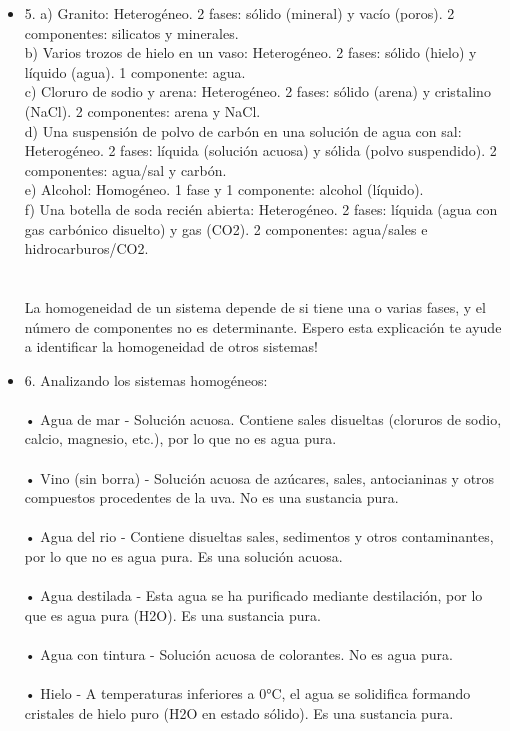 \documentclass{article}
\begin{document}
\begin{itemize}
\item{5.}
a) Granito: Heterogéneo. 2 fases: sólido (mineral) y vacío (poros). 2 componentes: silicatos y minerales.\\
b) Varios trozos de hielo en un vaso: Heterogéneo. 2 fases: sólido (hielo) y líquido (agua). 1 componente: agua.\\
c) Cloruro de sodio y arena: Heterogéneo. 2 fases: sólido (arena) y cristalino (NaCl). 2 componentes: arena y NaCl.\\
d) Una suspensión de polvo de carbón en una solución de agua con sal: Heterogéneo. 2 fases: líquida (solución acuosa) y sólida (polvo suspendido). 2 componentes: agua/sal y carbón.\\
e) Alcohol: Homogéneo. 1 fase y 1 componente: alcohol (líquido).\\
f) Una botella de soda recién abierta: Heterogéneo. 2 fases: líquida (agua con gas carbónico disuelto) y gas (CO2). 2 componentes: agua/sales e hidrocarburos/CO2.\\
\\
\\
La homogeneidad de un sistema depende de si tiene una o varias fases, y el número de componentes no es determinante. Espero esta explicación te ayude a identificar la homogeneidad de otros sistemas!\\
\item{6.}
Analizando los sistemas homogéneos:\\
\\
• Agua de mar - Solución acuosa. Contiene sales disueltas (cloruros de sodio, calcio, magnesio, etc.), por lo que no es agua pura.\\
\\
• Vino (sin borra) - Solución acuosa de azúcares, sales, antocianinas y otros compuestos procedentes de la uva. No es una sustancia pura.\\
\\
• Agua del rio - Contiene disueltas sales, sedimentos y otros contaminantes, por lo que no es agua pura. Es una solución acuosa.\\
\\
• Agua destilada - Esta agua se ha purificado mediante destilación, por lo que es agua pura (H2O). Es una sustancia pura.\\
\\
• Agua con tintura - Solución acuosa de colorantes. No es agua pura.\\
\\
• Hielo - A temperaturas inferiores a 0°C, el agua se solidifica formando cristales de hielo puro (H2O en estado sólido). Es una sustancia pura.\\

\end{itemize}
\end{document}
